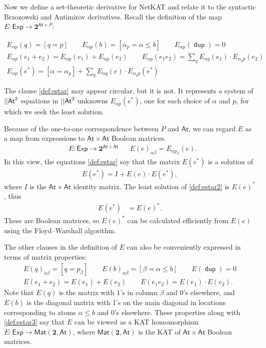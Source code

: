 \documentclass{article}
\newcommand\At{\ensuremath{\mathsf{At}}}
\newcommand\ssum{\mathop{\textstyle\sum}}
\newcommand\pdup{\mathop{\mathsf{dup}}}
\newcommand\Two{\mathbf{2}}
\newcommand\Exp{\mathsf{Exp}}
\newcommand\bval[1]{[#1]}
\renewcommand\star{^{\textstyle *}}
\newcommand\Mat[2]{\mathsf{Mat}(#1,#2)}
\begin{document}
Now we define a set-theoretic derivative for NetKAT and relate it to the syntactic Brzozowski and Antimirov derivatives. Recall the definition of the map $E:\Exp\to\Two^{\At\times P}$:

\begin{gather}
E_{\alpha p}(q) = \bval{q = p} \qquad
E_{\alpha p}(b) = \bval{\alpha_p=\alpha\leq b} \qquad
E_{\alpha p}(\pdup) = 0\nonumber\\
E_{\alpha p}(e_1+e_2) = E_{\alpha p}(e_1)+E_{\alpha p}(e_2) \qquad
E_{\alpha p}(e_1e_2) = \ssum_{q} E_{\alpha q}(e_1)\cdot E_{\alpha_q p}(e_2)\nonumber\\
E_{\alpha p}(e\star) = \bval{\alpha=\alpha_p} + \ssum_{q} E_{\alpha q}(e)\cdot E_{\alpha_q p}(e\star)\label{def:estar}
\end{gather}

The clause \eqref{def:estar} may appear circular, but it is not. It represents a system of $\len\At^2$ equations in $\len\At^2$ unknowns $E_{\alpha p}(e\star)$, one for each choice of $\alpha$ and $p$, for which we seek the least solution.

Because of the one-to-one correspondence between $P$ and $\At$, we can regard $E$ as a map from expressions to $\At\times\At$ Boolean matrices.
\begin{align}
& E:\Exp\to\Two^{\At\times\At} && 
E(e)_{\alpha\beta} = E_{\alpha p_\beta}(e).\label{eq:estar3}
\end{align}
In this view, the equations \eqref{def:estar} say that the matrix $E(e\star)$ is a solution of
\begin{gather}
E(e\star) = I + E(e)\cdot E(e\star),\label{def:estar2} 
\end{gather}
where $I$ is the $\At\times\At$ identity matrix. The least solution of \eqref{def:estar2} is $E(e)\star$, thus
\begin{align}
E(e\star) &= E(e)\star.\label{def:estar3}
\end{align}
These are Boolean matrices, so $E(e)\star$ can be calculated efficiently from $E(e)$ using the Floyd--Warshall algorithm.

The other clauses in the definition of $E$ can also be conveniently expressed in terms of matrix properties:
\begin{gather*}
E(q)_{\alpha\beta} = \bval{q = p_\beta} \qquad
E(b)_{\alpha\beta} = \bval{\beta=\alpha\leq b} \qquad
E(\pdup) = 0\\
E(e_1+e_2) = E(e_1)+E(e_2) \qquad
E(e_1e_2) = E(e_1)\cdot E(e_2).
\end{gather*}
Note that $E(q)$ is the matrix with 1's in column $\beta$ and 0's elsewhere, and $E(b)$ is the diagonal matrix with 1's on the main diagonal in locations corresponding to atoms $\alpha\leq b$ and 0's elsewhere. These properties along with \eqref{def:estar3} say that $E$ can be viewed as a KAT homomorphism $E:\Exp\to\Mat\Two\At$, where $\Mat\Two\At$ is the KAT of $\At\times\At$ Boolean matrices.
\end{document}
